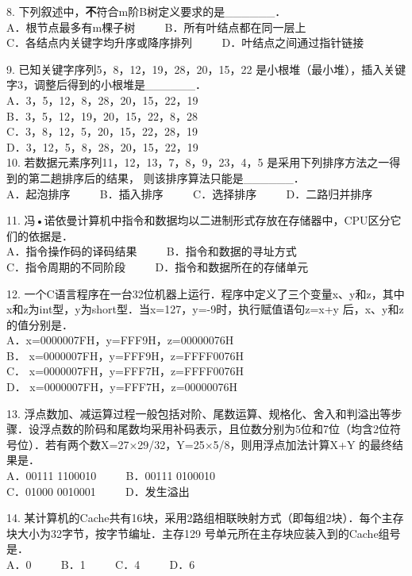 8. 下列叙述中，\textbf{不}符合m阶B树定义要求的是______． \\
A．根节点最多有m棵子树 $\qquad$ B．所有叶结点都在同一层上 \\
C．各结点内关键字均升序或降序排列 $\qquad$ D．叶结点之间通过指针链接

9. 已知关键字序列5，8，12，19，28，20，15，22 是小根堆（最小堆），插入关键字3，调整后得到的小根堆是______． \\
A．3，5，12，8，28，20，15，22，19 \\
B．3，5，12，19，20，15，22，8，28 \\
C．3，8，12，5，20，15，22，28，19 \\
D．3，12，5，8，28，20，15，22，19 \\

10. 若数据元素序列11，12，13，7，8，9，23，4，5 是采用下列排序方法之一得到的第二趟排序后的结果，
则该排序算法只能是______． \\
A．起泡排序 $\qquad$ B．插入排序 $\qquad$ C．选择排序 $\qquad$ D．二路归并排序

11. 冯•诺依曼计算机中指令和数据均以二进制形式存放在存储器中，CPU区分它们的依据是． \\
A．指令操作码的译码结果 $\qquad$ B．指令和数据的寻址方式 \\
C．指令周期的不同阶段 $\qquad$ D．指令和数据所在的存储单元

12. 一个C语言程序在一台32位机器上运行．程序中定义了三个变量x、y和z，其中x和z为int型，y为short型．当x=127，y=-9时，执行赋值语句z=x+y 后，x、y和z的值分别是． \\
A．x=0000007FH，y=FFF9H，z=00000076H \\
B． x=0000007FH，y=FFF9H，z=FFFF0076H \\
C． x=0000007FH，y=FFF7H，z=FFFF0076H \\
D． x=0000007FH，y=FFF7H，z=00000076H

13. 浮点数加、减运算过程一般包括对阶、尾数运算、规格化、舍入和判溢出等步骤．设浮点数的阶码和尾数均采用补码表示，且位数分别为5位和7位（均含2位符号位）．若有两个数X=27×29/32，Y=25×5/8，则用浮点加法计算X+Y 的最终结果是． \\
A．00111 1100010 $\qquad$ B．00111 0100010 \\
C．01000 0010001 $\qquad$ D．发生溢出

14. 某计算机的Cache共有16块，采用2路组相联映射方式（即每组2块）．每个主存块大小为32字节，按字节编址．主存129 号单元所在主存块应装入到的Cache组号是． \\
A．0 $\qquad$ B．1 $\qquad$ C．4 $\qquad$ D．6

